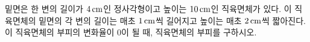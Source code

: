 밑면은 한 변의 길이가 $4\mkern3mu \mathrm{cm}$인 정사각형이고 높이는 $10\mkern3mu \mathrm{cm}$인 직육면체가 있다. 이 직육면체의 밑면의 각 변의 길이는 매초 $1\mkern3mu \mathrm{cm}$씩 길어지고 높이는 매초 $2\mkern3mu \mathrm{cm}$씩 짧아진다. 이 직육면체의 부피의 변화율이 $0$이 될 때, 직육면체의 부피를 구하시오.
